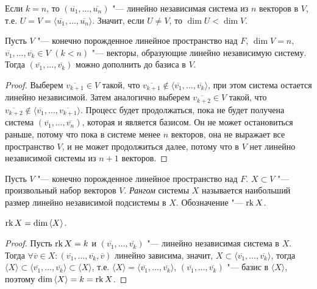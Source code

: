 \begin{note}
	Если $k = n$, то $(\overline{u_1}, \dots, \overline{u_n})$ "--- линейно независимая система из $n$ векторов в $V$, т.\:е. $U = V = \langle\overline{u_1}, \dots, \overline{u_n}\rangle$. Значит, если $U \ne V$, то $\dim{U} < \dim{V}$.
\end{note}

\begin{proposition}
	Пусть $V$ "--- конечно порожденное линейное пространство над $F$, $\dim{V} = n$, $\overline{v_1}, \dots, \overline{v_k} \in V$ $(k < n)$ "--- векторы, образующие линейно независимую систему. Тогда $(\overline{v_1}, \dots, \overline{v_k})$ можно дополнить до базиса в $V$.
\end{proposition}

\begin{proof}
	Выберем $\overline{v_{k+1}} \in V$ такой, что $\overline{v_{k+1}} \not\in \langle\overline{v_1}, \dots, \overline{v_k}\rangle$, при этом система остается линейно независимой. Затем аналогично выберем $\overline{v_{k+2}} \in V$ такой, что $\overline{v_{k+2}} \not\in \langle\overline{v_1}, \dots, \overline{v_{k+1}}\rangle$. Процесс будет продолжаться, пока не будет получена система $(\overline{v_1}, \dots, \overline{v_n})$, которая и является базисом. Он не может остановиться раньше, потому что пока в системе менее $n$ векторов, она не выражает все пространство $V$, и не может продолжиться далее, потому что в $V$ нет линейно независимой системы из $n + 1$ векторов.
\end{proof}

\begin{definition}
	Пусть $V$ "--- конечно порожденное линейное пространство над $F$. $X \subset V$ "--- произвольный набор векторов $V$. \textit{Рангом} системы $X$ называется наибольший размер линейно независимой подсистемы в $X$. Обозначение "--- $\operatorname{rk}{X}$.
\end{definition}

\begin{proposition}
	$\operatorname{rk}{X} = \dim{\langle X\rangle}$.
\end{proposition}

\begin{proof}
	Пусть $\operatorname{rk}{X} = k$ и $(\overline{v_1}, \dots, \overline{v_k})$ "--- линейно независимая система в $X$. Тогда $\forall \overline{v} \in X: (\overline{v_1}, \dots, \overline{v_k}, \overline{v})$ линейно зависима, значит, $X \subset \langle\overline{v_1}, \dots, \overline{v_k}\rangle$, тогда $\langle X \rangle \subset \langle\overline{v_1}, \dots, \overline{v_k}\rangle \subset \langle X \rangle$, т.\:е. $\langle X \rangle = \langle\overline{v_1}, \dots, \overline{v_k}\rangle$, $(\overline{v_1}, \dots, \overline{v_k})$ "--- базис в $\langle X\rangle$, поэтому $\dim{\langle X\rangle} = k \hm{=} \rk{X}$.
\end{proof}

